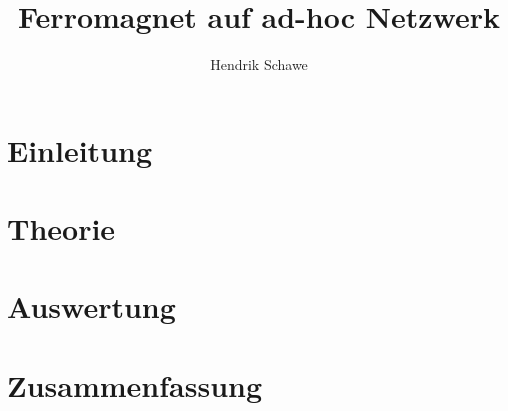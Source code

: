 \documentclass[a4paper,12pt,titlepage,twoside]{scrartcl}
\title{Ferromagnet auf ad-hoc Netzwerk}
\author{Hendrik Schawe}
\date{}
\begin{document}
    \maketitle

    \cleardoublepage
    \tableofcontents

    \clearpage
    \section{Einleitung}
        

    \section{Theorie}
        

    \section{Auswertung}
        

    \section{Zusammenfassung}

    
    
\end{document}
